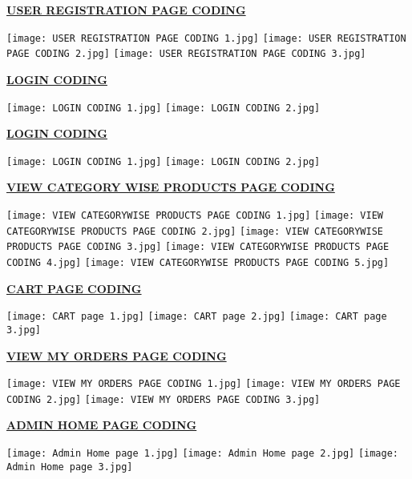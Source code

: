 \documentclass[12pt]{report}
\begin{document}
    \pagebreak
    \textbf{\underline{\large USER REGISTRATION PAGE CODING}}
    \begin{center}
        \texttt{[image: USER REGISTRATION PAGE CODING 1.jpg]}
        \texttt{[image: USER REGISTRATION PAGE CODING 2.jpg]}
        \texttt{[image: USER REGISTRATION PAGE CODING 3.jpg]}
    \end{center}
    
    \pagebreak
    \textbf{\underline{\large LOGIN CODING}}
    \begin{center}
        \texttt{[image: LOGIN CODING 1.jpg]}
        \texttt{[image: LOGIN CODING 2.jpg]}
    \end{center}
    
    \pagebreak
    \textbf{\underline{\large LOGIN CODING}}
    \begin{center}
        \texttt{[image: LOGIN CODING 1.jpg]}
        \texttt{[image: LOGIN CODING 2.jpg]}
    \end{center}
    
    \pagebreak
    \textbf{\underline{\large VIEW CATEGORY WISE PRODUCTS PAGE CODING}}
    \begin{center}
        \texttt{[image: VIEW CATEGORYWISE PRODUCTS PAGE CODING 1.jpg]}
        \texttt{[image: VIEW CATEGORYWISE PRODUCTS PAGE CODING 2.jpg]}
        \texttt{[image: VIEW CATEGORYWISE PRODUCTS PAGE CODING 3.jpg]}
        \texttt{[image: VIEW CATEGORYWISE PRODUCTS PAGE CODING 4.jpg]}
        \texttt{[image: VIEW CATEGORYWISE PRODUCTS PAGE CODING 5.jpg]}
    \end{center}
    
    \pagebreak
    \textbf{\underline{\large CART PAGE CODING}}
    \begin{center}
        \texttt{[image: CART page 1.jpg]}
        \texttt{[image: CART page 2.jpg]}
        \texttt{[image: CART page 3.jpg]}
    \end{center}
    
     \pagebreak
    \textbf{\underline{\large VIEW MY ORDERS PAGE CODING}}
    \begin{center}
        \texttt{[image: VIEW MY ORDERS PAGE CODING 1.jpg]}
        \texttt{[image: VIEW MY ORDERS PAGE CODING 2.jpg]}
        \texttt{[image: VIEW MY ORDERS PAGE CODING 3.jpg]}
    \end{center}
    
    \pagebreak
    \textbf{\underline{\large ADMIN HOME PAGE CODING}}
    \begin{center}
        \texttt{[image: Admin Home page 1.jpg]}
        \texttt{[image: Admin Home page 2.jpg]}
        \texttt{[image: Admin Home page 3.jpg]}
    \end{center}
    
\end{document}
